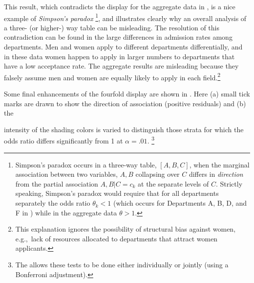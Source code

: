 This result, which contradicts the display for the aggregate data in
, is a nice example of
\emph{Simpson's paradox}%
\footnote{Simpson's paradox \citep{Simpson:51} occurs in a three-way
table, $[A, B, C]$, when the marginal association between two variables,
$A, B$ collapsing over $C$ differs in \emph{direction} from the partial
association $A, B | C= c_k$ at the separate levels of $C$.
Strictly speaking, Simpson's paradox would require that for all
departments separately the odds ratio $\theta_k < 1$
(which occurs for Departments A, B, D, and F in )
while in the aggregate data $\theta > 1$.
},
and illustrates clearly why an overall analysis of a three- (or higher-)
way table can be misleading.
The resolution of this contradiction can be found in the large
differences in admission rates among departments.  Men and women
apply to different departments differentially, and in these data
women happen to apply in larger numbers to departments that have a low
acceptance rate.  The aggregate results are misleading because they
falsely assume men and women are equally likely to apply in each
field.\footnote{This explanation ignores the possibility of structural bias
against women, e.g.,\ lack of resources allocated to departments that
attract women applicants.}

\begin{changebar}
Some final enhancements
of the fourfold display are
 shown in .
Here (a) small tick marks are drawn to show the direction of association
(positive residuals)
and (b) the
\end{changebar} 
intensity of the shading colors is varied to distinguish
those strata for which the odds ratio differs significantly from 1
at $\alpha = .01$.%
\footnote{The  allows these tests to be done either
individually or jointly (using a Bonferroni adjustment).}

